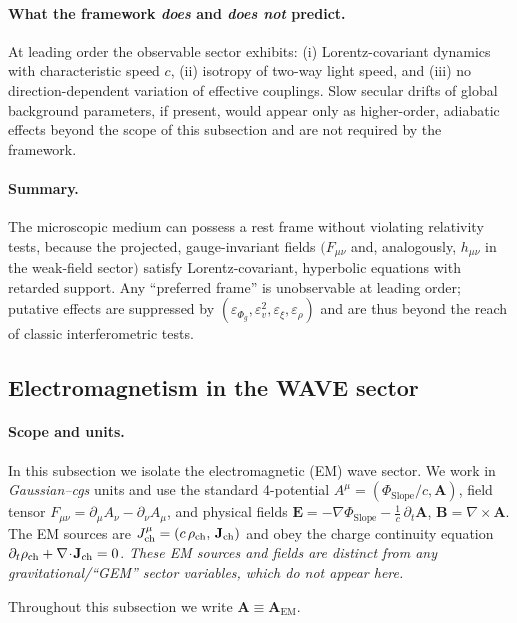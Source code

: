 \paragraph{What the framework \emph{does} and \emph{does not} predict.}
At leading order the observable sector exhibits: (i) Lorentz-covariant dynamics with characteristic speed $c$, (ii) isotropy of two-way light speed, and (iii) no direction-dependent variation of effective couplings. Slow secular drifts of global background parameters, if present, would appear only as higher-order, adiabatic effects beyond the scope of this subsection and are not required by the framework.

\paragraph{Summary.}
The microscopic medium can possess a rest frame without violating relativity tests, because the projected, gauge-invariant fields $(F_{\mu\nu}$ and, analogously, $h_{\mu\nu}$ in the weak-field sector$)$ satisfy Lorentz-covariant, hyperbolic equations with retarded support. Any ``preferred frame'' is unobservable at leading order; putative effects are suppressed by $(\varepsilon_{\Phi_g},\varepsilon_v^2,\varepsilon_\xi,\varepsilon_\rho)$ and are thus beyond the reach of classic interferometric tests.

\subsection{Electromagnetism in the WAVE sector}
\label{subsec:em_wave}

\paragraph{Scope and units.}
In this subsection we isolate the electromagnetic (EM) wave sector. We work in \emph{Gaussian--cgs} units and use the standard 4-potential
\(A^\mu=(\Phi_{\text{Slope}}/c,\mathbf A)\), field tensor \(F_{\mu\nu}=\partial_\mu A_\nu-\partial_\nu A_\mu\),
and physical fields \(\mathbf E=-\nabla\Phi_{\text{Slope}}-\tfrac1c\,\partial_t\mathbf A\), \(\mathbf B=\nabla\times\mathbf A\).
The EM sources are \(J^\mu_{\rm ch}=(c\,\rho_{\rm ch},\,\mathbf J_{\rm ch})\) and obey the
charge continuity equation \(\partial_t\rho_{\rm ch}+\nabla\!\cdot\!\mathbf J_{\rm ch}=0\).
\emph{These EM sources and fields are distinct from any gravitational/``GEM'' sector variables, which do not appear here.}

Throughout this subsection we write $\mathbf A \equiv \mathbf A_{\text{EM}}$.

